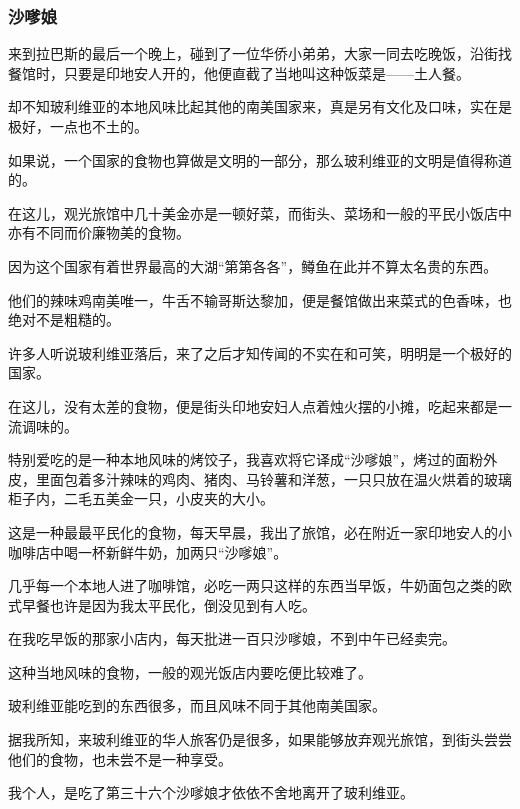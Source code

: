 \subsubsection*{沙嗲娘}
\par 来到拉巴斯的最后一个晚上，碰到了一位华侨小弟弟，大家一同去吃晚饭，沿街找餐馆时，只要是印地安人开的，他便直截了当地叫这种饭菜是——土人餐。
\par 却不知玻利维亚的本地风味比起其他的南美国家来，真是另有文化及口味，实在是极好，一点也不土的。
\par 如果说，一个国家的食物也算做是文明的一部分，那么玻利维亚的文明是值得称道的。
\par 在这儿，观光旅馆中几十美金亦是一顿好菜，而街头、菜场和一般的平民小饭店中亦有不同而价廉物美的食物。
\par 因为这个国家有着世界最高的大湖“第第各各”，鳟鱼在此并不算太名贵的东西。
\par 他们的辣味鸡南美唯一，牛舌不输哥斯达黎加，便是餐馆做出来菜式的色香味，也绝对不是粗糙的。
\par 许多人听说玻利维亚落后，来了之后才知传闻的不实在和可笑，明明是一个极好的国家。
\par 在这儿，没有太差的食物，便是街头印地安妇人点着烛火摆的小摊，吃起来都是一流调味的。
\par 特别爱吃的是一种本地风味的烤饺子，我喜欢将它译成“沙嗲娘”，烤过的面粉外皮，里面包着多汁辣味的鸡肉、猪肉、马铃薯和洋葱，一只只放在温火烘着的玻璃柜子内，二毛五美金一只，小皮夹的大小。
\par 这是一种最最平民化的食物，每天早晨，我出了旅馆，必在附近一家印地安人的小咖啡店中喝一杯新鲜牛奶，加两只“沙嗲娘”。
\par 几乎每一个本地人进了咖啡馆，必吃一两只这样的东西当早饭，牛奶面包之类的欧式早餐也许是因为我太平民化，倒没见到有人吃。
\par 在我吃早饭的那家小店内，每天批进一百只沙嗲娘，不到中午已经卖完。
\par 这种当地风味的食物，一般的观光饭店内要吃便比较难了。
\par 玻利维亚能吃到的东西很多，而且风味不同于其他南美国家。
\par 据我所知，来玻利维亚的华人旅客仍是很多，如果能够放弃观光旅馆，到街头尝尝他们的食物，也未尝不是一种享受。
\par 我个人，是吃了第三十六个沙嗲娘才依依不舍地离开了玻利维亚。
